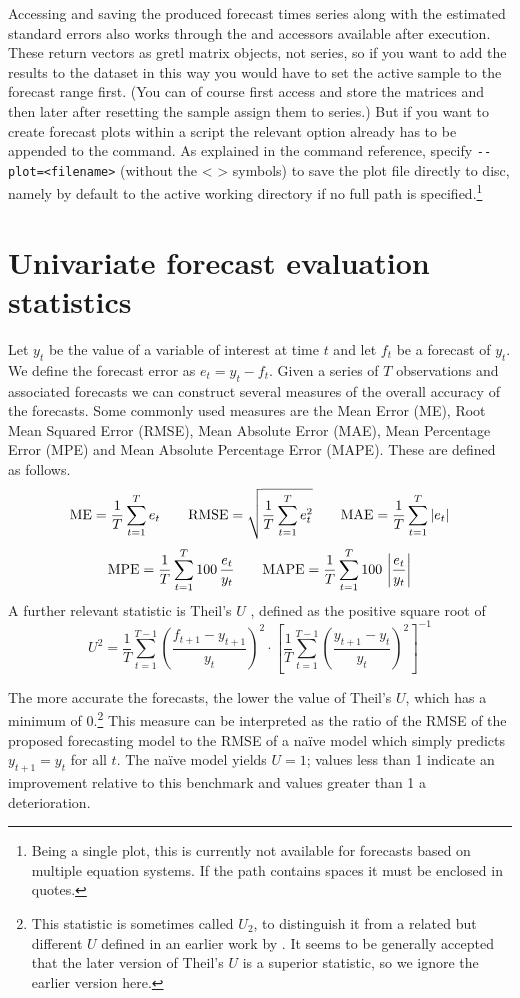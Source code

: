 Accessing and saving the produced forecast times series along with the 
estimated standard errors also works through 
the  and  accessors available after 
 execution. These return vectors as gretl matrix objects, not
series, so if you want to add the results to the dataset in this way you
would have to set the active sample to the forecast range first. (You 
can of course first access and store the matrices and then later after 
resetting the sample assign them to series.)
But if you want to create forecast plots within a
script the relevant option already has to be appended to the 
command. As explained in the 
command reference, specify \verb|--plot=<filename>| (without the < > 
symbols) to save the plot file directly to disc, namely by default to 
the active working directory if no full path is specified.\footnote{%
Being a single plot, this is currently not available
for forecasts based on multiple equation systems. If the path contains
spaces it must be enclosed in quotes.} 

\section{Univariate forecast evaluation statistics}
\label{sec:fcast-stats}

Let $y_t$ be the value of a variable of interest at time $t$ and let
$f_t$ be a forecast of $y_t$.  We define the forecast error as
$e_t = y_t - f_t$.  Given a series of $T$ observations and associated
forecasts we can construct several measures of the overall accuracy of
the forecasts.  Some commonly used measures are the Mean Error (ME),
Root Mean Squared Error (RMSE), Mean Absolute Error (MAE), Mean
Percentage Error (MPE) and Mean Absolute Percentage Error (MAPE).
These are defined as follows.
%
\[ {\rm ME} = \frac{1}{T} \sum_{t=1}^T e_t \qquad 
   {\rm RMSE} = \sqrt{\frac{1}{T} \sum_{t=1}^T e_t^2} \qquad 
   {\rm MAE} = \frac{1}{T} \sum_{t=1}^T |e_t|
\] 
%
\[ {\rm MPE} = \frac{1}{T} \sum_{t=1}^T 100\, \frac{e_t}{y_t} \qquad
   {\rm MAPE} = \frac{1}{T} \sum_{t=1}^T 100\, \left|\frac{e_t}{y_t}\right| 
\]
%
A further relevant statistic is Theil's $U$ \citep{theil66}, defined as
the positive square root of
%
\[ 
U^2 = \frac{1}{T}
     \sum_{t=1}^{T-1} \left(\frac{f_{t+1} - y_{t+1}}{y_t}\right)^2
     \cdot \left[
     \frac{1}{T} \sum_{t=1}^{T-1} 
        \left(\frac{y_{t+1} - y_t}{y_t}\right)^2 \right]^{-1}
\]

The more accurate the forecasts, the lower the value of Theil's $U$,
which has a minimum of 0.\footnote{This statistic is sometimes called
  $U_2$, to distinguish it from a related but different $U$ defined in
  an earlier work by \cite{theil61}.  It seems to be generally accepted
  that the later version of Theil's $U$ is a superior statistic, so we
  ignore the earlier version here.} This measure can be interpreted as
the ratio of the RMSE of the proposed forecasting model to the RMSE of
a na\"ive model which simply predicts $y_{t+1} = y_t$ for all $t$.
The na\"ive model yields $U = 1$; values less than 1 indicate an
improvement relative to this benchmark and values greater than 1 a
deterioration.

